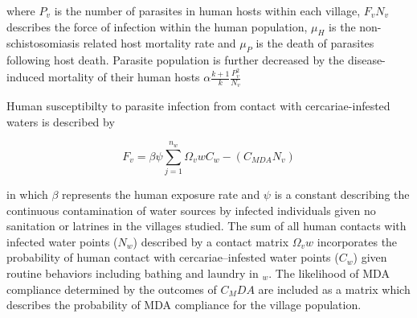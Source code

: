 \documentclass[12pt]{article}
\begin{document}
where $P_v$ is the number of parasites in human hosts within each village, $F_vN_v$ describes the force of infection within the human population, $\mu_H$ is the non-schistosomiasis related host mortality rate and  $\mu_P$ is the death of parasites following host death. Parasite population is further decreased by the disease-induced mortality of their human hosts $\alpha \frac{k +1 }{k}\frac{P_v^2}{N_v}$
\linebreak

 Human susceptibilty to parasite infection from contact with cercariae-infested waters is described by

\begin{equation}\label{eq:ForceofInfection}
 F_v = \beta \psi \sum_{j=1}^{n_w} \Omega_vw C_w - (C_{MDA}{N_v})
\end{equation}

in which $\beta$ represents the human exposure rate and $\psi$ is a constant describing the continuous contamination of water sources by infected individuals given no sanitation or latrines in the villages studied. The sum of all human contacts with infected water points ($N_w$) described by a contact matrix $\Omega_vw$ incorporates the probability of human contact with cercariae--infested water points ($C_w$) given routine behaviors including bathing and laundry in $_w$. The likelihood of MDA compliance determined by the outcomes of $C_MDA$ are included as a matrix which describes the probability of MDA compliance for the village population. 


 
\end{document}
